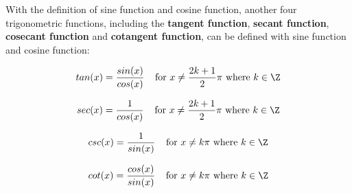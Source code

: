 \begin{dft}
  With the definition of sine function and cosine function, another four trigonometric functions, including the \textbf{tangent function}, \textbf{secant function}, \textbf{cosecant function} and \textbf{cotangent function}, can be defined with sine function and cosine function:

  $$tan(x)=\frac{sin(x)}{cos(x)}\;\;\;\;\text{for }x\neq \frac{2k+1}{2}\pi \text{ where }k\in \Z$$\s

  $$sec(x)=\frac{1}{cos(x)}\;\;\;\;\text{for }x\neq \frac{2k+1}{2}\pi \text{ where }k\in \Z$$\s

  $$csc(x)=\frac{1}{sin(x)}\;\;\;\;\text{for }x\neq k\pi \text{ where }k\in \Z$$\s

  $$cot(x)=\frac{cos(x)}{sin(x)}\;\;\;\;\text{for }x\neq k\pi \text{ where }k\in \Z$$
\end{dft}

